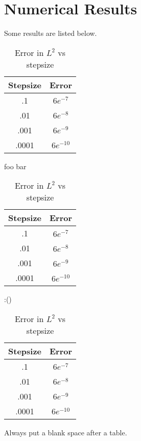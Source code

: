 \documentclass[11pt]{article}
\numberwithin{equation}{section}
\theoremstyle{definition}
\begin{document}
\section{Numerical Results}
Some results are listed below.
\begin{table}[H]
	\caption{Error in $L^2$ vs stepsize}
	\label{some_table}
	\begin{center}
	\begin{tabular}{|c|c|}
	\hline
	Stepsize & Error \\ \hline
	.1 & $6e^{-7}$ \\ \hline
	.01 & $6e^{-8}$ \\ \hline
	.001 & $6e^{-9}$ \\ \hline
	.0001 & $6e^{-10}$ \\
	\hline
	\end{tabular}
	\end{center}
\end{table}
foo bar
\begin{table}[H]
	\caption{Error in $L^2$ vs stepsize}
	\label{some_table_2}
	\begin{center}
	\begin{tabular}{|c|c|}
	\hline
	Stepsize & Error \\ \hline
	.1 & $6e^{-7}$ \\ \hline
	.01 & $6e^{-8}$ \\ \hline
	.001 & $6e^{-9}$ \\ \hline
	.0001 & $6e^{-10}$ \\
	\hline
	\end{tabular}
	\end{center}
\end{table}
:()
\begin{table}[H]
	\caption{Error in $L^2$ vs stepsize}
	\label{some_table_3}
	\begin{center}
	\begin{tabular}{|c|c|}
	\hline
	Stepsize & Error \\ \hline
	.1 & $6e^{-7}$ \\ \hline
	.01 & $6e^{-8}$ \\ \hline
	.001 & $6e^{-9}$ \\ \hline
	.0001 & $6e^{-10}$ \\
	\hline
	\end{tabular}
	\end{center}
\end{table}
Always put a blank space after a table.



\end{document}
